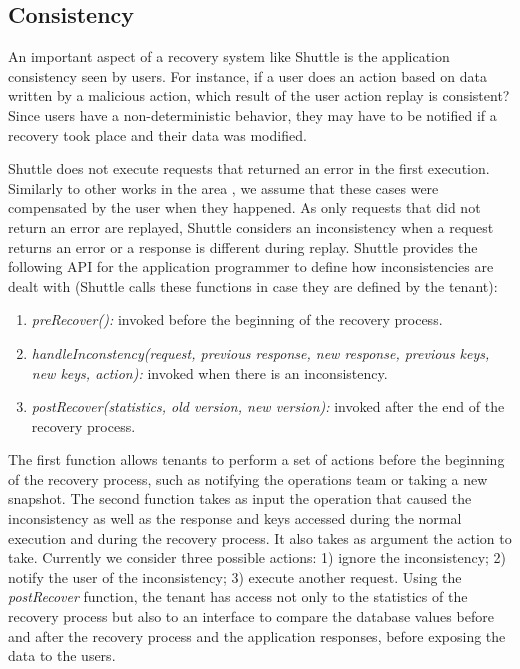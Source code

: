 \subsection{Consistency}
\label{sec:recovery:consistency}

An important aspect of a recovery system like Shuttle is the application consistency seen by users. For instance, if a user does an action based on data written by a malicious action, which result of the user action replay is consistent? Since users have a non-deterministic behavior, they may have to be notified if a recovery took place and their data was modified.

Shuttle does not execute requests that returned an error in the first execution. Similarly to other works in the area \cite{undoForOperators}, we assume that these cases were compensated by the user when they happened. As only requests that did not return an error are replayed, Shuttle considers an inconsistency when a request returns an error or a response is different during replay. Shuttle provides the following API for the application programmer to define how inconsistencies are dealt with (Shuttle calls these functions in case they are defined by the tenant):

\begin{enumerate}
  \item \textit{preRecover():} invoked before the beginning of the recovery process.
  \item \textit{handleInconstency(request, previous response, new response, previous keys, new keys, action):} invoked when there is an inconsistency.
  \item \textit{postRecover(statistics, old version, new version):} invoked after the end of the recovery process.
\end{enumerate}

The first function allows tenants to perform a set of actions before the beginning of the recovery process, such as notifying the operations team or taking a new snapshot. 
The second function takes as input the operation that caused the inconsistency as well as the response and keys accessed during the normal execution and during the recovery process. It also takes as argument the action to take. Currently we consider three possible actions: 1) ignore the inconsistency; 2) notify the user of the inconsistency; 3) execute another request. 
Using the \textit{postRecover} function, the tenant has access not only to the statistics of the recovery process but also to an interface to compare the database values before and after the recovery process and the application responses, before exposing the data to the users. 

